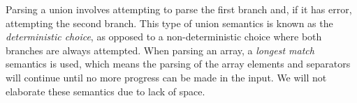 Parsing a union involves attempting to parse the first branch and, 
if it has error, attempting the second branch. This type of union semantics 
is known as the {\em deterministic choice}, as opposed to a non-deterministic
choice where both branches are always attempted. 
When parsing an array, a {\em longest match} semantics is used, 
which means the parsing of the array elements and separators will 
continue until no more progress can be made in
the input. We will not elaborate these semantics due to lack of space.

%

